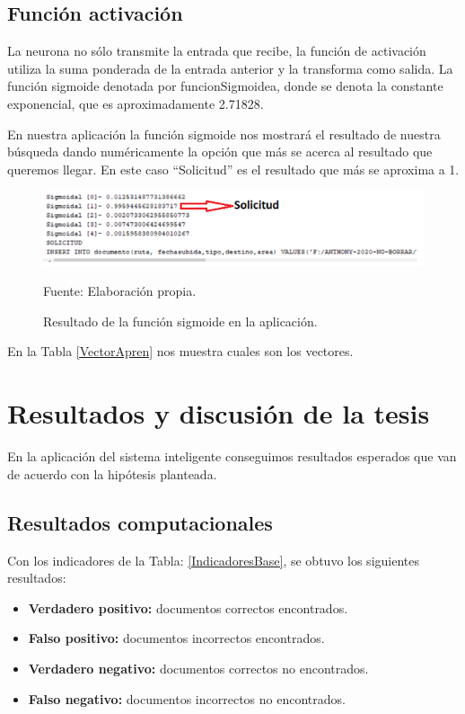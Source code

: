 \newpage
\section{Función activación}
La neurona no sólo transmite la entrada que recibe, la función de activación utiliza la suma ponderada de la entrada anterior y la transforma como salida. La función sigmoide denotada por funcionSigmoidea, donde se denota la constante exponencial, que es aproximadamente 2.71828.

En nuestra aplicación la función sigmoide nos mostrará el resultado de nuestra búsqueda dando numéricamente la opción que más se acerca al resultado que queremos llegar. En este caso ``Solicitud'' es el resultado que más se aproxima a 1.

\begin{figure}[h!]
	\centering
		\includegraphics[scale=0.8]{imagenes/ResultadoFunSigmoide.png}
		\caption{Resultado de la función sigmoide en la aplicación.}
		\begin{center}
    Fuente: Elaboración propia.
    \end{center}
	\label{fig:ResultadoFunSigmoide}
\end{figure}
En la Tabla \ref{VectorApren} nos muestra cuales son los vectores.
\newpage


\newpage


\chapter{Resultados y discusión de la tesis}

En la aplicación del sistema inteligente conseguimos resultados esperados que van de acuerdo con la hipótesis planteada.


\section{Resultados computacionales}
Con los indicadores de la Tabla: \ref{IndicadoresBase}, se obtuvo los siguientes resultados:
\begin{itemize}
\item \textbf{Verdadero positivo: }documentos correctos encontrados.
\item \textbf{Falso positivo: } documentos incorrectos encontrados.
\item \textbf{Verdadero negativo: } documentos correctos no encontrados.
\item \textbf{Falso negativo: } documentos incorrectos no encontrados.
\end{itemize}


